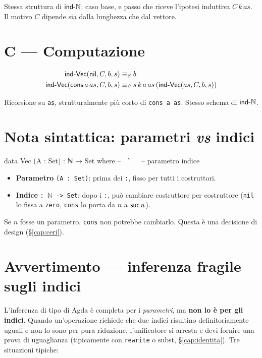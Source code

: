 Stessa struttura di $\mathsf{ind\text{-}\mathbb{N}}$: caso base, e passo che riceve l'ipotesi induttiva $C\,k\,as$. Il motivo $C$ dipende sia dalla lunghezza che dal vettore.

\section*{C --- Computazione}
\begin{align*}
\mathsf{ind\text{-}Vec}(\mathsf{nil},         C, b, s) &\equiv_{\beta} b \\
\mathsf{ind\text{-}Vec}(\mathsf{cons}\,a\,as, C, b, s) &\equiv_{\beta} s\,k\,a\,as\,(\mathsf{ind\text{-}Vec}(as, C, b, s))
\end{align*}

Ricorsione su \texttt{as}, strutturalmente pi\`u corto di \texttt{cons a as}. Stesso schema di $\mathsf{ind\text{-}\mathbb{N}}$.

\section*{Nota sintattica: parametri \emph{vs} indici}

\begin{agda}
data Vec (A : Set) : ℕ → Set where
--       ^^^^^^^^   ^^^^^^^^^
--       parametro  indice
\end{agda}

\begin{itemize}
\item \textbf{Parametro} \texttt{(A : Set)}: prima dei \texttt{:}, fisso per tutti i costruttori.
\item \textbf{Indice} \texttt{: $\mathbb{N}$ -> Set}: dopo i \texttt{:}, pu\`o cambiare costruttore per costruttore (\texttt{nil} lo fissa a \texttt{zero}, \texttt{cons} lo porta da $n$ a $\mathsf{suc}\,n$).
\end{itemize}

Se $n$ fosse un parametro, \texttt{cons} non potrebbe cambiarlo. Questa \`e una decisione di design (\S\ref{cap:ceri}).

\section*{Avvertimento --- inferenza fragile sugli indici}

L'inferenza di tipo di Agda \`e completa per i \emph{parametri}, ma \textbf{non lo \`e per gli indici}. Quando un'operazione richiede che due indici risultino definitoriamente uguali e non lo sono per pura riduzione, l'unificatore si arresta e devi fornire una prova di uguaglianza (tipicamente con \texttt{rewrite} o $\mathrm{subst}$, \S\ref{cap:identita}). Tre situazioni tipiche:

